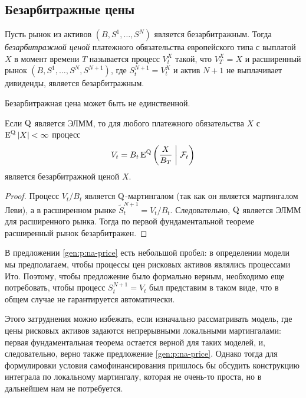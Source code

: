 \subsection{Безарбитражные цены}
\label{gen:s:na-prices}

\begin{definition}
Пусть рынок из активов $(B,S^1,\dots,S^N)$ является безарбитражным.
Тогда \emph{безарбитражной ценой} платежного обязательства европейского типа с выплатой $X$ в момент времени $T$ называется процесс $V_t^X$ такой, что $V_T^X = X$ и расширенный рынок $(B,S^1,\dots,S^N,S^{N+1})$, где $S^{N+1}_t = V_t^X$ и актив $N+1$ не выплачивает дивиденды, является безарбитражным.
\end{definition}

\begin{remark}
Безарбитражная цена может быть не единственной.
\end{remark}

\begin{proposition}
\label{gen:p:na-price}
Если $\mathrm{Q}$ является ЭЛММ, то для любого платежного обязательства $X$ с $\operatorname{E}^{\mathrm{Q}} |X| < \infty$ процесс 
\[
V_t = B_t \operatorname{E}^{\mathrm{Q}} \left(\frac{X}{B_T} \;\bigg|\; \mathcal{F}_t\right)
\]
является безарбитражной ценой $X$.
\end{proposition}

\begin{proof}
Процесс $V_t/B_t$ является $\mathrm{Q}$-мартингалом (так как он является мартингалом Леви), а в расширенном рынке $\tilde S_t^{N+1} = V_t/B_t$. 
Следовательно, $\mathrm{Q}$ является ЭЛММ для расширенного рынка.
Тогда по первой фундаментальной теореме расширенный рынок безарбитражен.
\end{proof}

\begin{remark}
В предложении \ref{gen:p:na-price} есть небольшой пробел: в определении модели мы предполагаем, чтобы процессы цен рисковых активов являлись процессами Ито.
Поэтому, чтобы предложение было формально верным, необходимо еще потребовать, чтобы процесс $S_t^{N+1} = V_t$ был представим в таком виде, что в общем случае не гарантируется автоматически. 

Этого затруднения можно избежать, если изначально рассматривать модель, где цены рисковых активов задаются непрерывными локальными мартингалами: первая фундаментальная теорема остается верной для таких моделей, и, следовательно, верно также предложение \ref{gen:p:na-price}.
Однако тогда для формулировки условия самофинансирования пришлось бы обсудить конструкцию интеграла по локальному мартингалу, которая не очень-то проста, но в дальнейшем нам не потребуется.
\end{remark}

